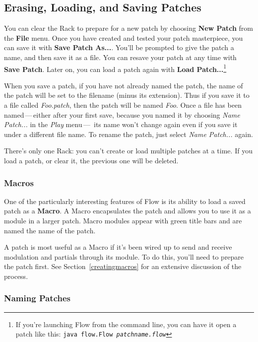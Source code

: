 \documentclass{article}
\newcommand\name{Flow}
\begin{document}
\subsection{Erasing, Loading, and Saving Patches}

You can clear the Rack to prepare for a new patch by choosing {\bf New Patch} from the {\bf File} menu.  Once you have created and tested your patch masterpiece, you can save it with {\bf Save Patch As...}.  You'll be prompted to give the patch a name, and then save it as a file.   You can resave your patch at any time with {\bf Save Patch}.  Later on, you can load a patch again with {\bf Load Patch...}\footnote{If you're launching Flow from the command line, you can have it open a patch like this:\hspace{\fill} {\tt java flow.Flow \textit{patchname.flow}}}

When you save a patch, if you have not already named the patch, the name of the patch will be set to the filename (minus its extension).  Thus if you save it to a file called {\it Foo.patch}, then the patch will be named {\it Foo}.  Once a file has been named\,---\,either after your first save, because you named it by choosing {\it Name Patch...} in the {\it Play} menu\,---\, its name won't change again even if you save it under a different file name.  To rename the patch, just select {\it Name Patch...} again.

There's only one Rack: you can't create or load multiple patches at a time.  If you load a patch, or clear it, the previous one will be deleted.

\subsubsection{Macros}
\label{aboutmacros}

One of the particularly interesting features of {\name} is its ability to load a saved patch as a {\bf Macro}.  A Macro encapsulates the patch and allows you to use it as a module in a larger patch.  Macro modules appear with green title bars and are named the name of the patch.

A patch is most useful as a Macro if it's been wired up to send and receive modulation and partials through its module.  To do this, you'll need to prepare the patch first.  See Section~\ref{creatingmacros} for an extensive discussion of the process.

\subsubsection{Naming Patches}
\end{document}
